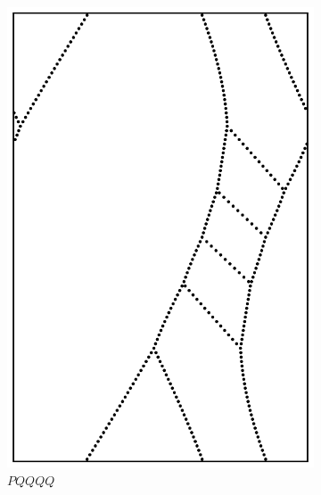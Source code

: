 \documentclass[12pt,twoside]{reedthesis}
\theoremstyle{definition}
\begin{document}
\begin{figure}[h]
\begin{subfigure}[t]{0.24\textwidth}
    \includegraphics[width=\textwidth]{figures/string_cheese_appendix/pqqqq.pdf}
    \caption*{$PQQQQ$}
    \vspace{5mm}
  \end{subfigure}
  \hfill
  \begin{subfigure}[t]{0.24\textwidth}

\end{subfigure}
\end{figure}
\end{document}
